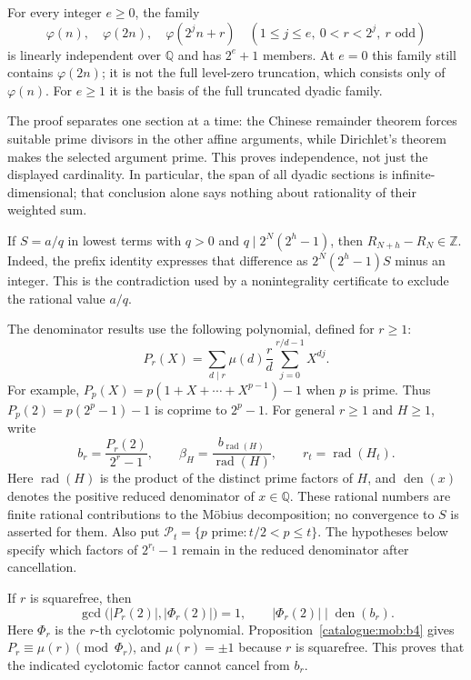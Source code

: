 \begin{thm}\label{catalogue:cert:d4}
For every integer $e\ge0$, the family
\[
 \varphi(n),\quad\varphi(2n),\quad
 \varphi(2^jn+r)\quad(1\le j\le e,\ 0<r<2^j,\ r\text{ odd})
\]
is linearly independent over $\mathbb Q$ and has $2^e+1$ members.
At $e=0$ this family still contains $\varphi(2n)$; it is not the full
level-zero truncation, which consists only of $\varphi(n)$. For $e\ge1$
it is the basis of the full truncated dyadic family.

The proof separates one section at a time: the Chinese remainder theorem
forces suitable prime divisors in the other affine arguments, while
Dirichlet's theorem makes the selected argument prime. This proves
independence, not just the displayed cardinality. In particular, the
span of all dyadic sections is infinite-dimensional; that conclusion
alone says nothing about rationality of their weighted sum.
\end{thm}

\begin{prop}\label{catalogue:cert:a8}
If $S=a/q$ in lowest terms with $q>0$ and
$q\mid2^N(2^h-1)$, then $R_{N+h}-R_N\in\mathbb Z$.
Indeed, the prefix identity expresses that difference as
$2^N(2^h-1)S$ minus an integer. This is the contradiction used by a
nonintegrality certificate to exclude the rational value $a/q$.
\end{prop}

The denominator results use the following polynomial, defined for $r\ge1$:
\[
 P_r(X)=\sum_{d\mid r}\mu(d)\frac rd
                 \sum_{j=0}^{r/d-1}X^{dj}.
\]
For example, $P_p(X)=p(1+X+\cdots+X^{p-1})-1$ when $p$ is prime.
Thus $P_p(2)=p(2^p-1)-1$ is coprime to $2^p-1$.
For general $r\ge1$ and $H\ge1$, write
\[
 b_r=\frac{P_r(2)}{2^r-1},\qquad
 \beta_H=\frac{b_{\operatorname{rad}(H)}}{\operatorname{rad}(H)},
 \qquad r_t=\operatorname{rad}(H_t).
\]
Here $\operatorname{rad}(H)$ is the product of the distinct prime
factors of $H$, and $\operatorname{den}(x)$ denotes the positive
reduced denominator of $x\in\mathbb Q$. These rational numbers are
finite rational contributions to the M\"obius decomposition; no convergence
to $S$ is asserted for them.
Also put
$\mathcal P_t=\{p\text{ prime}:t/2<p\le t\}$.
The hypotheses below specify which factors of $2^{r_t}-1$ remain in
the reduced denominator after cancellation.

\begin{prop}\label{catalogue:mob:b5}
If $r$ is squarefree, then
\[
 \gcd\bigl(|P_r(2)|,|\Phi_r(2)|\bigr)=1,
 \qquad |\Phi_r(2)|\mid\operatorname{den}(b_r).
\]
Here $\Phi_r$ is the $r$-th cyclotomic polynomial. Proposition~\ref{catalogue:mob:b4}
gives $P_r\equiv\mu(r)\pmod{\Phi_r}$, and $\mu(r)=\pm1$ because
$r$ is squarefree. This proves that the indicated cyclotomic factor
cannot cancel from $b_r$.
\end{prop}

